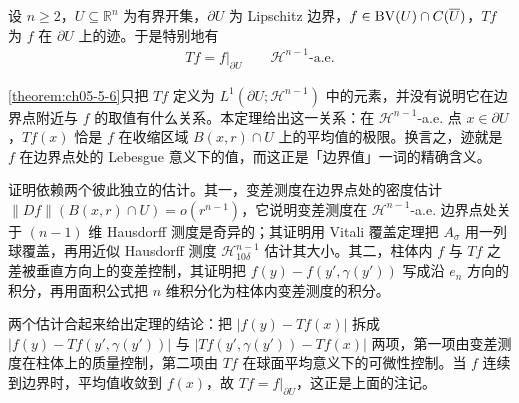 \documentclass[../../main.tex]{subfiles}%
\begin{document}
\begin{remark}\label{remark:ch05-thm-5-7-连续}
设 $n\geqslant2$，$U\subseteq\mathbb{R}^n$ 为有界开集，$\partial U$ 为 Lipschitz 边界，$f\in\mathrm{BV}(U)\cap C(\overline{U})$，$Tf$ 为 $f$ 在 $\partial U$ 上的迹。于是特别地有
\begin{align*}
Tf=f|_{\partial U}\qquad\mathcal{H}^{n-1}\text{-a.e.}
\end{align*}
\end{remark}

\begin{remark}\label{remark:ch05-thm-5-7-动机}
\cref{theorem:ch05-5-6}只把 $Tf$ 定义为 $L^1(\partial U;\mathcal{H}^{n-1})$ 中的元素，并没有说明它在边界点附近与 $f$ 的取值有什么关系。本定理给出这一关系：在 $\mathcal{H}^{n-1}$-a.e. 点 $x\in\partial U$，$Tf(x)$ 恰是 $f$ 在收缩区域 $B(x,r)\cap U$ 上的平均值的极限。换言之，迹就是 $f$ 在边界点处的 Lebesgue 意义下的值，而这正是「边界值」一词的精确含义。%

证明依赖两个彼此独立的估计。其一，变差测度在边界点处的密度估计 $\lVert Df\rVert(B(x,r)\cap U)=o(r^{n-1})$，它说明变差测度在 $\mathcal{H}^{n-1}$-a.e. 边界点处关于 $(n-1)$ 维 Hausdorff 测度是奇异的；其证明用 Vitali 覆盖定理把 $A_\sigma$ 用一列球覆盖，再用近似 Hausdorff 测度 $\mathcal{H}^{n-1}_{10\delta}$ 估计其大小。其二，柱体内 $f$ 与 $Tf$ 之差被垂直方向上的变差控制，其证明把 $f(y)-f(y',\gamma(y'))$ 写成沿 $e_n$ 方向的积分，再用面积公式把 $n$ 维积分化为柱体内变差测度的积分。

两个估计合起来给出定理的结论：把 $\lvert f(y)-Tf(x)\rvert$ 拆成 $\lvert f(y)-Tf(y',\gamma(y'))\rvert$ 与 $\lvert Tf(y',\gamma(y'))-Tf(x)\rvert$ 两项，第一项由变差测度在柱体上的质量控制，第二项由 $Tf$ 在球面平均意义下的可微性控制。当 $f$ 连续到边界时，平均值收敛到 $f(x)$，故 $Tf=f|_{\partial U}$，这正是上面的注记。
\end{remark}
\end{document}

